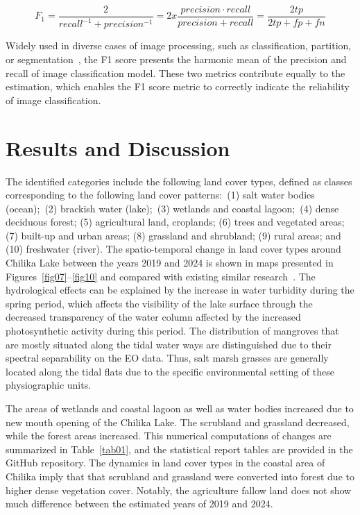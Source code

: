\documentclass[jmse,article,accept,pdftex,oneauthor]{Definitions/mdpi}
\begin{document}
\begin{equation}
F_1 = \frac{2}{recall^{-1} + precision^{-1}} = 2 x \frac{precision \cdot recall}{precision + recall} = \frac{2tp}{2tp + fp + fn}
\label{eq7}
\end{equation}

Widely used in diverse cases of image processing, such as classification, partition, or segmentation~\cite{HUANG2018202,Song,Lietal2023}, the F1 score presents the harmonic mean of the precision and recall of image classification model. These two metrics contribute equally to the estimation, which enables the F1 score metric to correctly indicate the reliability of image classification.

\section{Results and Discussion}

{The identified categories include the following land cover types, defined as classes corresponding to the following land cover patterns:~(1) salt water bodies (ocean);~(2) brackish water (lake);~(3) wetlands and coastal lagoon;~(4) dense deciduous forest; (5) agricultural land, croplands; (6) trees and vegetated areas; (7) built-up and urban areas; (8) grassland and shrubland; (9) rural areas; and (10) freshwater (river). The spatio-temporal change in land cover types around Chilika Lake between the years 2019 and 2024 is shown in maps presented in Figures~\ref{fig07}--\ref{fig10} and compared with   existing similar research~\cite{Sinha2020,Mangla}. The hydrological effects can be explained by the increase in water turbidity during the spring period, which affects the visibility of the lake surface through the decreased transparency of the water column affected by the increased photosynthetic activity during this period. The distribution of mangroves that are mostly situated along the tidal water ways are distinguished due to their spectral separability on the EO data. Thus, salt marsh grasses are generally located along the tidal flats due to the specific environmental setting of these physiographic units. }

The areas of wetlands and coastal lagoon as well as water bodies increased due to new mouth opening of the Chilika Lake. The scrubland and grassland decreased, while the forest areas increased. This numerical computations of changes are summarized in Table~\ref{tab01}, and the statistical report tables are provided in the GitHub repository. The dynamics in land cover types in the coastal area of Chilika imply that that scrubland and grassland were converted into forest due to higher dense vegetation cover. Notably, the agriculture fallow land does not show much difference between the estimated years of 2019 and 2024.
\end{document}
